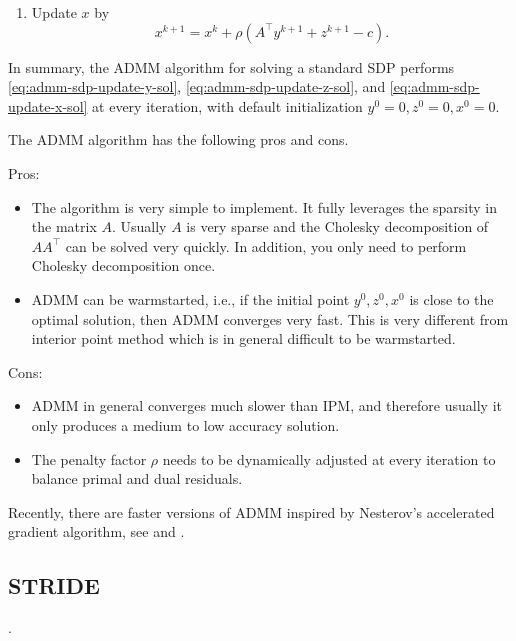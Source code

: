\documentclass[
]{book}
\theoremstyle{definition}
\theoremstyle{definition}
\theoremstyle{definition}
\theoremstyle{definition}
\theoremstyle{remark}
\begin{document}
\begin{enumerate}
\begin{equation}
  \boxed{
   z^{k+1} = \Pi_{\mathbb{S}^{n}_{+}} \left( c - \frac{1}{\rho}x^k - A^\top y^{k+1} \right)
  }.
  \label{eq:admm-sdp-update-z-sol}
  \end{equation}
  Note that the projection of a symmetric matrix to the PSD cone can be done in closed-form. In particular, let \(M = V \Lambda V^\top\) be the spectral decomposition of \(M \in \mathbb{S}^{n}\) with
  \[
  \Lambda = \mathrm{diag}(\lambda_1,\dots,\lambda_n)
  \]
  a diagonal matrix with all the eigenvalues sorted as \(\lambda_1 \geq \lambda_2 \geq \dots \geq \lambda_n\). Let
  \[
  \Lambda_+ = \mathrm{diag}(\max\{ \lambda_1,0 \}, \dots, \max\{ \lambda_n, 0 \}),
  \]
  then the projection of \(M\) onto the PSD cone is
  \[
  \Pi_{M} = V \Lambda_+ V^\top.
  \]
\item
  Update \(x\) by
  \begin{equation}
  \boxed{
  x^{k+1} = x^k + \rho(A^\top y^{k+1} + z^{k+1} - c)
  }.
  \label{eq:admm-sdp-update-x-sol}
  \end{equation}
\end{enumerate}

In summary, the ADMM algorithm for solving a standard SDP performs \eqref{eq:admm-sdp-update-y-sol}, \eqref{eq:admm-sdp-update-z-sol}, and \eqref{eq:admm-sdp-update-x-sol} at every iteration, with default initialization \(y^0=0,z^0=0,x^0 = 0\).

The ADMM algorithm has the following pros and cons.

Pros:

\begin{itemize}
\item
  The algorithm is very simple to implement. It fully leverages the sparsity in the matrix \(A\). Usually \(A\) is very sparse and the Cholesky decomposition of \(AA^\top\) can be solved very quickly. In addition, you only need to perform Cholesky decomposition once.
\item
  ADMM can be warmstarted, i.e., if the initial point \(y^0,z^0,x^0\) is close to the optimal solution, then ADMM converges very fast. This is very different from interior point method which is in general difficult to be warmstarted.
\end{itemize}

Cons:

\begin{itemize}
\item
  ADMM in general converges much slower than IPM, and therefore usually it only produces a medium to low accuracy solution.
\item
  The penalty factor \(\rho\) needs to be dynamically adjusted at every iteration to balance primal and dual residuals.
\end{itemize}

Recently, there are faster versions of ADMM inspired by Nesterov's accelerated gradient algorithm, see \citep{goldstein14sijis-fastadmm} and \citep{kim21mp-accelerated}.

\subsection{STRIDE}\label{stride}

\citep{yang22mp-inexact}.

  
\end{document}
